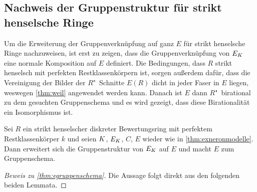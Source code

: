 \subsection{Nachweis der Gruppenstruktur für strikt henselsche Ringe}
Um die Erweiterung der Gruppenverknüpfung auf ganz $E$ für strikt
henselsche Ringe nachzuweisen, ist erst zu zeigen, dass die
Gruppenverknüpfung von $E_{K}$ eine normale Komposition auf $E$
definiert.
Die Bedingungen, dass $R$ strikt henselsch mit perfekten
Restklassenkörpern ist, sorgen außerdem dafür, dass die Vereinigung
der Bilder der $R$"~Schnitte $E(R)$ dicht in jeder Faser in $E$ liegen,
weswegen \ref{thm:weil} angewendet werden kann.
Danach ist $E$ dann $R$"~birational zu dem gesuchten
Gruppenschema und es wird gezeigt, dass diese Birationalität ein
Isomorphismus ist.
\begin{Satz}\label{thm:egruppenschema}
  Sei $R$ ein strikt henselscher diskreter Bewertungsring mit
  perfektem Restklassenkörper $k$ und seien $K$, $E_{K}$, $C$, $E$
  wieder wie in \ref{thm:exneronmodelle}.
  Dann erweitert sich die Gruppenstruktur von $E_{K}$ auf $E$ und macht
  $E$ zum Gruppenschema.
  \begin{proof}[Beweis zu \ref{thm:egruppenschema}]
    Die Aussage folgt direkt aus den folgenden beiden Lemmata.
  \end{proof}
\end{Satz}
